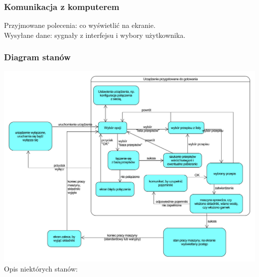 \documentclass[12pt,a4paper,notitlepage]{article}
\begin{document}
\subsubsection{Komunikacja z komputerem}
Przyjmowane polecenia: co wyświetlić na ekranie.\\
Wysyłane dane: sygnały z interfejsu i wybory użytkownika.

\subsubsection{Diagram stanów}
\includegraphics[width=\textwidth,height=\textheight,keepaspectratio=true]{Diagram-stanow-interfejs.pdf}\\
\small
Opis niektórych stanów:
\end{document}
